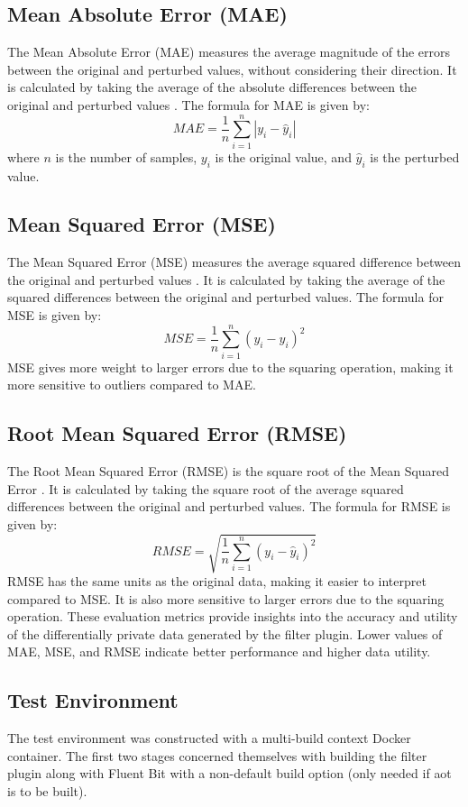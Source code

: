 \subsection{Mean Absolute Error (MAE)}
The Mean Absolute Error (MAE) measures the average magnitude of the errors between the original and perturbed values, without considering their direction. It is calculated by taking the average of the absolute differences between the original and perturbed values \cite{Willmott2005}. The formula for MAE is given by:
\begin{equation}
MAE = \frac{1}{n} \sum_{i=1}^{n} |y_i - \hat{y}_i|
\end{equation}
where $n$ is the number of samples, $y_i$ is the original value, and $\hat{y}_i$ is the perturbed value.
\subsection{Mean Squared Error (MSE)}
The Mean Squared Error (MSE) measures the average squared difference between the original and perturbed values \cite{ZhouWang2009}. It is calculated by taking the average of the squared differences between the original and perturbed values. The formula for MSE is given by:
\begin{equation}
MSE = \frac{1}{n} \sum_{i=1}^{n} (y_i - \hat{y}_i)^2
\end{equation}
MSE gives more weight to larger errors due to the squaring operation, making it more sensitive to outliers compared to MAE.
\subsection{Root Mean Squared Error (RMSE)}
The Root Mean Squared Error (RMSE) is the square root of the Mean Squared Error \cite{Chai2014}. It is calculated by taking the square root of the average squared differences between the original and perturbed values. The formula for RMSE is given by:
\begin{equation}
RMSE = \sqrt{\frac{1}{n} \sum_{i=1}^{n} (y_i - \hat{y}_i)^2}
\end{equation}
RMSE has the same units as the original data, making it easier to interpret compared to MSE. It is also more sensitive to larger errors due to the squaring operation.
These evaluation metrics provide insights into the accuracy and utility of the differentially private data generated by the filter plugin. Lower values of MAE, MSE, and RMSE indicate better performance and higher data utility.
\subsection{Test Environment}
The test environment was constructed with a multi-build context Docker container. The first two stages concerned themselves with building the filter plugin along with Fluent Bit with a non-default build option (only needed if \acrshort{aot} is to be built).
